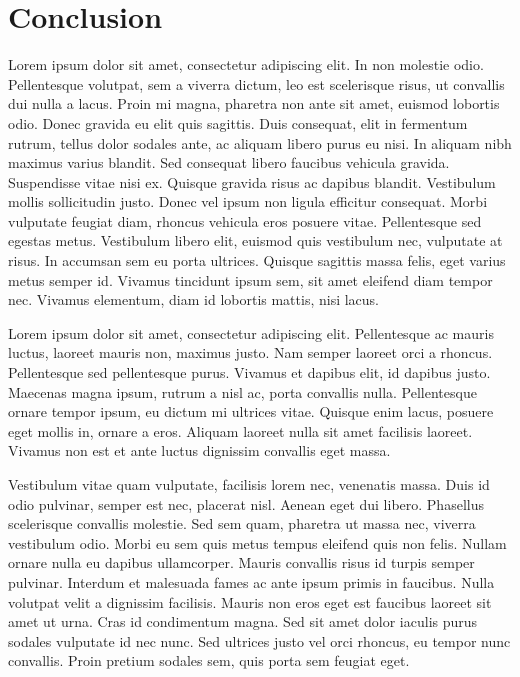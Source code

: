 \chapter{Conclusion}
Lorem ipsum dolor sit amet, consectetur adipiscing elit. In non molestie odio. Pellentesque volutpat, sem a viverra dictum, leo est scelerisque risus, ut convallis dui nulla a lacus. Proin mi magna, pharetra non ante sit amet, euismod lobortis odio. Donec gravida eu elit quis sagittis. Duis consequat, elit in fermentum rutrum, tellus dolor sodales ante, ac aliquam libero purus eu nisi. In aliquam nibh maximus varius blandit. Sed consequat libero faucibus vehicula gravida. Suspendisse vitae nisi ex. Quisque gravida risus ac dapibus blandit. Vestibulum mollis sollicitudin justo. Donec vel ipsum non ligula efficitur consequat. Morbi vulputate feugiat diam, rhoncus vehicula eros posuere vitae. Pellentesque sed egestas metus. Vestibulum libero elit, euismod quis vestibulum nec, vulputate at risus. In accumsan sem eu porta ultrices. Quisque sagittis massa felis, eget varius metus semper id. Vivamus tincidunt ipsum sem, sit amet eleifend diam tempor nec. Vivamus elementum, diam id lobortis mattis, nisi lacus.

Lorem ipsum dolor sit amet, consectetur adipiscing elit. Pellentesque ac mauris luctus, laoreet mauris non, maximus justo. Nam semper laoreet orci a rhoncus. Pellentesque sed pellentesque purus. Vivamus et dapibus elit, id dapibus justo. Maecenas magna ipsum, rutrum a nisl ac, porta convallis nulla. Pellentesque ornare tempor ipsum, eu dictum mi ultrices vitae. Quisque enim lacus, posuere eget mollis in, ornare a eros. Aliquam laoreet nulla sit amet facilisis laoreet. Vivamus non est et ante luctus dignissim convallis eget massa.

Vestibulum vitae quam vulputate, facilisis lorem nec, venenatis massa. Duis id odio pulvinar, semper est nec, placerat nisl. Aenean eget dui libero. Phasellus scelerisque convallis molestie. Sed sem quam, pharetra ut massa nec, viverra vestibulum odio. Morbi eu sem quis metus tempus eleifend quis non felis. Nullam ornare nulla eu dapibus ullamcorper. Mauris convallis risus id turpis semper pulvinar. Interdum et malesuada fames ac ante ipsum primis in faucibus. Nulla volutpat velit a dignissim facilisis. Mauris non eros eget est faucibus laoreet sit amet ut urna. Cras id condimentum magna. Sed sit amet dolor iaculis purus sodales vulputate id nec nunc. Sed ultrices justo vel orci rhoncus, eu tempor nunc convallis. Proin pretium sodales sem, quis porta sem feugiat eget.

